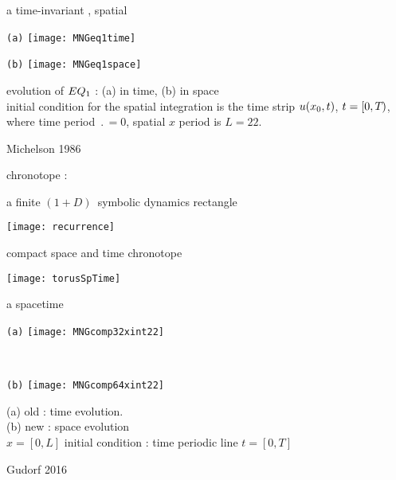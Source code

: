 \begin{frame}{a time-invariant \eqv, spatial \po}
\begin{center}
  \begin{minipage}[height=.45\textheight]{.45\textwidth}
    \centering \small{\texttt{(a)}}
    \texttt{[image: MNGeq1time]}
  \end{minipage}
  \begin{minipage}[height=.45\textheight]{.45\textwidth}
    \centering \small{\texttt{(b)}}
    \texttt{[image: MNGeq1space]}
  \end{minipage}
\end{center}
  evolution of $EQ_{1}$ : (a) in time, (b) in space
   \\
   initial condition for the spatial integration is the time strip
   $u(x_0,t)$, $t = [0,{T_{}})$, where time period
   $\period{} =0$, spatial $x$ period is $L=22$.

\vfill\hfill        Michelson 1986
\end{frame}


\begin{frame}{chronotope : }

a finite $(1+D)$\dmn\ symbolic dynamics rectangle

\begin{center}
\texttt{[image: recurrence]}
\end{center}
\hfill \color{red}{make it doubly periodic}
\end{frame}

\begin{frame}{compact space and time chronotope}
\begin{center}
\texttt{[image: torusSpTime]}
\end{center}
\end{frame}

\begin{frame}{a spacetime {\twot}
}
\begin{center}
  \begin{minipage}[height=.40\textheight]{.35\textwidth}
    \centering \small{\texttt{(a)}}
    \texttt{[image: MNGcomp32xint22]}
  \end{minipage}
~~~~~~~~~
  \begin{minipage}[height=.40\textheight]{.35\textwidth}
    \centering \small{\texttt{(b)}}
    \texttt{[image: MNGcomp64xint22]}
  \end{minipage}
\end{center}
    (a) old : time evolution.
\\
    (b) new : space evolution
    \\
    $x=[0,L]$ %
       initial condition : time periodic line $t = [0,T]$

\vfill\hfill        Gudorf 2016
\end{frame}


